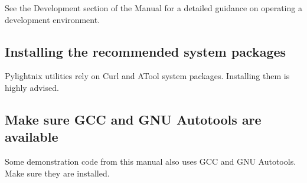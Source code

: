 See the Development section of the Manual for a detailed guidance on operating a
development environment.

\subsection{Installing the recommended system packages}

Pylightnix utilities rely on Curl and ATool system packages. Installing them
is highly advised.


\subsection{Make sure GCC and GNU Autotools are available}

Some demonstration code from this manual also uses GCC and GNU Autotools. Make
sure they are installed.



